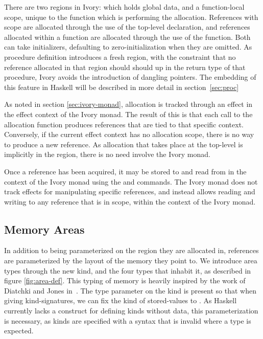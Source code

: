 There are two regions in Ivory:  which holds global data, and a
function-local scope, unique to the function which is performing the allocation.
References with  scope are allocated through the use of the 
top-level declaration, and references allocated within a function are allocated
through the use of the  function.  Both can take initializers,
defaulting to zero-initialization when they are omitted.  As procedure
definition introduces a fresh region, with the constraint that no reference
allocated in that region should should up in the return type of that procedure,
Ivory avoids the introduction of dangling pointers.  The embedding of this
feature in Haskell will be described in more detail in section~\ref{sec:proc}

As noted in section \ref{sec:ivory-monad}, allocation is tracked through an
effect in the effect context of the Ivory monad.  The result of this is that
each call to the  allocation function produces references that are
tied to that specific context.  Conversely, if the current effect context has
no allocation scope, there is no way to produce a new reference.  As allocation
that takes place at the top-level is implicitly in the  region, there
is no need involve the Ivory monad.

Once a reference has been acquired, it may be stored to and read from in the
context of the Ivory monad using the  and  commands.  The
Ivory monad does not track effects for manipulating specific references, and
instead allows reading and writing to any reference that is in scope, within the
context of the Ivory monad.

\subsection{Memory Areas}
\label{sec:area}

In addition to being parameterized on the region they are allocated in,
references are parameterized by the layout of the memory they point to.  We
introduce area types through the new  kind, and the four types that
inhabit it, as described in figure \ref{fig:area-def}.  This typing of memory is
heavily inspired by the work of Diatchki and Jones in~\cite{memareas}.  The type
parameter on the  kind is present so that when giving kind-signatures,
we can fix the kind of stored-values to \cd{*}.  As Haskell currently lacks a
construct for defining kinds without data, this parameterization is necessary,
as kinds are specified with a syntax that is invalid where a type is expected.

